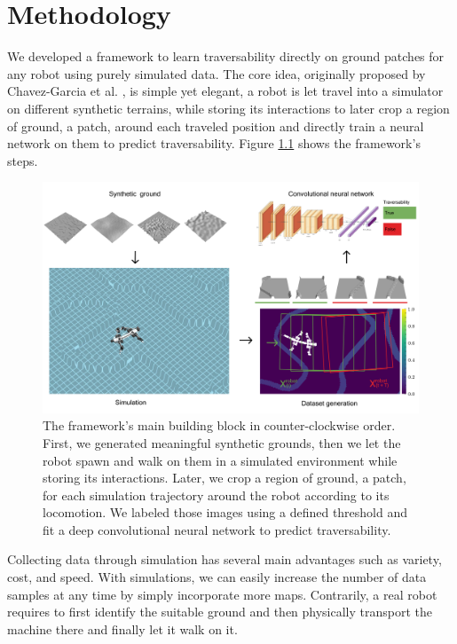 \documentclass[../document.tex]{subfiles}
\begin{document}
\chapter{Methodology}
\label{chap: methodology}
We developed a framework to learn traversability directly on ground patches for any robot using purely simulated data. The core idea, originally proposed by Chavez-Garcia et al. \cite{omar2018traversability}, is simple yet elegant, a robot is let travel into a simulator on different synthetic terrains, while storing its interactions to later crop a region of ground, a patch, around each traveled position and directly train a neural network on them to predict traversability. Figure \ref{fig : pipeline} shows the framework's steps.

\begin{figure} [htbp]
    \centering
        \includegraphics[width=\textwidth]{../img/method.png}
    \caption{The framework's main building block in counter-clockwise order. First, we generated meaningful synthetic grounds, then we let the robot spawn and walk on them in a simulated environment while storing its interactions. Later, we crop a region of ground, a patch, for each simulation trajectory around the robot according to its locomotion. We labeled those images using a defined threshold and fit a deep convolutional neural network to predict traversability. }
    \label{fig : pipeline}
    \end{figure}
Collecting data through simulation has several main advantages such as variety, cost, and speed. With simulations, we can easily increase the number of data samples at any time by simply incorporate more maps. Contrarily, a real robot requires to first identify the suitable ground and then physically transport the machine there and finally let it walk on it.
\end{document}
